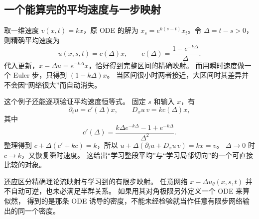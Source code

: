\subsection{一个能算完的平均速度与一步映射}
取一维速度 $v(x,t)=kx$，原 ODE 的解为
$x_s=e^{k(s-t)}x_t$。令 $\Delta=t-s>0$，则精确平均速度为
\[
u(x,s,t)=c(\Delta)x,\qquad c(\Delta)=\frac{1-e^{-k\Delta}}{\Delta}.
\]
代入更新，$x-\Delta u=e^{-k\Delta}x$，恰好得到完整区间的精确映射。
而用瞬时速度做一个 Euler 步，只得到 $(1-k\Delta)x$。
当区间很小时两者接近，大区间时其差异并不会因“网络很大”而自动消失。

这个例子还能逐项验证平均速度恒等式。
固定 $s$ 和输入 $x$，有
\[
\partial_tu=c'(\Delta)x,\qquad D_xu\,v=kc(\Delta)x,
\]
其中
\[
c'(\Delta)=\frac{k\Delta e^{-k\Delta}-1+e^{-k\Delta}}{\Delta^2}.
\]
整理得到 $c+\Delta(c'+kc)=k$，所以
$u+\Delta(\partial_tu+D_xu\,v)=kx=v$。
$\Delta\to0$ 时 $c\to k$，又恢复瞬时速度。
这给出“学习整段平均”与“学习局部切向”的一个可直接比较的对象。

还应区分精确理论流映射与学习到的有限步映射。
任意网络 $x-\Delta u_\theta(x,s,t)$ 并不自动可逆，也未必满足半群关系。
如果用其对角极限另外定义一个 ODE 来算似然，
得到的是那条 ODE 诱导的密度，不能未经检验就当作任意有限步网络输出的同一个密度。
